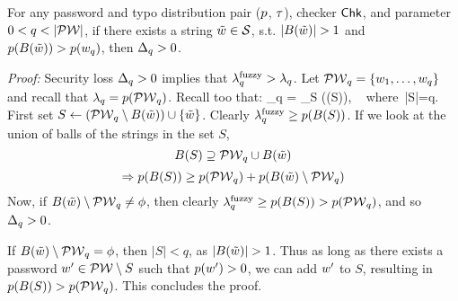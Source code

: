 \setcounter{theorem}{3}
\begin{lemma}
\label{th:secloss}
For any password and typo distribution pair ($p$, $\tau$), checker $\textnormal{\textsf{Chk}}$, and parameter
$0<q<|\PW|$, if there exists a string $\tilde{w}\in\mathcal{S}$,
s.t. $|\ball(\pwtypo)|>1$ and
$p(B(\tilde{w}))>p({w}_q)$, then 
$\Delta_q > 0$.
\end{lemma}

\noindent\emph{Proof:}  Security loss $\Delta_q>0$ implies that
$ \lambda^\textnormal{fuzzy}_q > \lambda_q$. Let $\mathcal{PW}_q = \{{w}_1, \ldots, {w}_q\}$ and recall that
$\lambda_q = p(\mathcal{PW}_q)$.  Recall too that:
\bnm \fuzzlambda_q = \max_{S\subseteq\strings} \pwprob(\ball(S)), \,\,\mbox{ where }|S|=q.\enm
First set $S\leftarrow
(\mathcal{PW}_q\setminus B(\tilde{w}))\cup\{\tilde{w}\}$.
Clearly $\lambda^\textnormal{fuzzy}_q\ge p(B(S))$.  If we look at the union
of balls of the strings in the set $S$,
\[
  B(S) \supseteq \mathcal{PW}_q\cup B(\tilde{w})
\]
\[  
  \Rightarrow p(B(S)) \ge p(\mathcal{PW}_q) + p(B(\tilde{w})\setminus\mathcal{PW}_q) 
\]
Now, if $B(\tilde{w})\setminus\mathcal{PW}_q\ne\phi$, then clearly $\lambda^\textnormal{fuzzy}_q\ge p(B(S))>p(\mathcal{PW}_q)$, and so $\Delta_q>0$. 

If $B(\tilde{w})\setminus\mathcal{PW}_q=\phi$, then $|S| < q$, as
$|\ball(\pwtypo)|>1$. Thus as long as there exists a password
${w}'\in \mathcal{PW}\setminus S$ such that $p({w}')>0$, we can add
${w}'$ to $S$, resulting in $p(B(S)) > p(\mathcal{PW}_q)$. This
concludes the proof.  \qedsym




